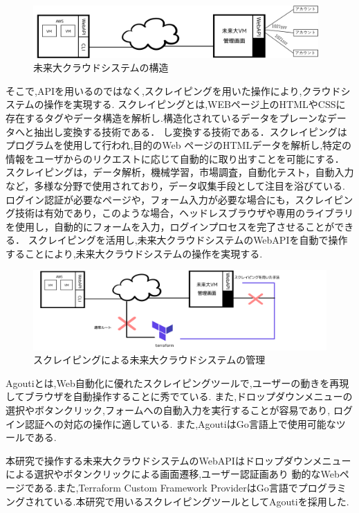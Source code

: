 \documentclass[11pt]{ujarticle}\sloppy
\begin{document}
\begin{figure}[h]
	\includegraphics[width=1\linewidth,height=2cm]{./images/cloud.png}
	\caption{未来大クラウドシステムの構造}
  \label{fig:cloud}
\end{figure}

そこで,APIを用いるのではなく,スクレイピングを用いた操作により,クラウドシステムの操作を実現する.
スクレイピングとは,WEBページ上のHTMLやCSSに存在するタグやデータ構造を解析し.構造化されているデータをプレーンなデータへと抽出し変換する技術である．
し変換する技術である．スクレイピングはプログラムを使用して行われ,目的のWeb ページのHTMLデータを解析し,特定の情報をユーザからのリクエストに応じて自動的に取り出すことを可能にする．
スクレイピングは，データ解析，機械学習，市場調査，自動化テスト，自動入力など，多様な分野で使用されており，データ収集手段として注目を浴びている.
ログイン認証が必要なページや，フォーム入力が必要な場合にも，スクレイピング技術は有効であり，このような場合，ヘッドレスブラウザや専用のライブラリを使用し，自動的にフォームを入力，ログインプロセスを完了させることができる．
スクレイピングを活用し,未来大クラウドシステムのWebAPIを自動で操作することにより,未来大クラウドシステムの操作を実現する.


\begin{figure}[h]
	\includegraphics[width=1\linewidth]{./images/scraping.png}
	\caption{スクレイピングによる未来大クラウドシステムの管理}
  \label{fig:scraping}
\end{figure}


Agoutiとは,Web自動化に優れたスクレイピングツールで,ユーザーの動きを再現してブラウザを自動操作することに秀でている.
また,ドロップダウンメニューの選択やボタンクリック,フォームへの自動入力を実行することが容易であり,
ログイン認証への対応の操作に適している.
また,AgoutiはGo言語上で使用可能なツールである.



本研究で操作する未来大クラウドシステムのWebAPIはドロップダウンメニューによる選択やボタンクリックによる画面遷移,ユーザー認証画あり
動的なWebページである.また,Terraform Custom Framework ProviderはGo言語でプログラミングされている.本研究で用いるスクレイピングツールとしてAgoutiを採用した.
\end{document}
